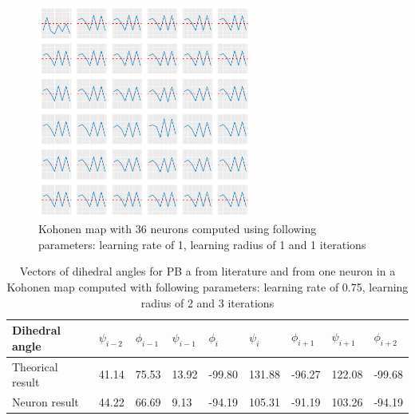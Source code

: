 \documentclass[11pt,a4paper]{article}
\begin{document}
    \begin{figure}[h!]
        \centering
        \includegraphics[height=7cm]{img/mutliple_graph_36_neurons_learn_rate_1_1_1.pdf}
        \caption{Kohonen map with 36 neurons computed using following parameters: learning rate of 1, learning radius of 1 and 1 iterations}
        \label{fig:mutliple_graph_36_neurons_learn_rate_1_1_1}
    \end{figure}
    
    \begin{table}[h!]
        \centering
        \begin{tabular}{|l|l|l|l|l|l|l|l|l|}
        \hline
        Dihedral angle & $\psi_{i-2}$ & $\phi_{i-1}$ & $\psi_{i-1}$ & $\phi_{i}$ & $\psi_{i}$ & $\phi_{i+1}$ & $\psi_{i+1}$ &  $\phi_{i+2}$ \\ \hline
        Theorical result & 41.14 & 75.53 & 13.92 & -99.80 & 131.88 & -96.27 & 122.08 & -99.68 \\ \hline
        Neuron result & 44.22 & 66.69 & 9.13 & -94.19 & 105.31 & -91.19 & 103.26 & -94.19  \\ \hline
        \end{tabular}
        \caption{Vectors of dihedral angles for PB a from literature and from one neuron in a Kohonen map computed with following parameters: learning rate of 0.75, learning radius of 2 and 3 iterations }
        \label{theorical}
    \end{table}
    
\end{document}
